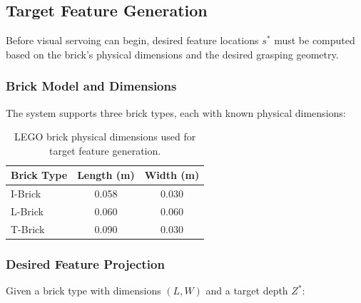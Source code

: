 \subsection{Target Feature Generation}

Before visual servoing can begin, desired feature locations $s^*$ must be computed based on the brick's physical dimensions and the desired grasping geometry.

\subsubsection{Brick Model and Dimensions}
The system supports three brick types, each with known physical dimensions:

\begin{table}[H]
    \centering
    \begin{tabular}{|l|c|c|}
        \hline
        \textbf{Brick Type} & \textbf{Length (m)} & \textbf{Width (m)} \\
        \hline
        I-Brick & 0.058 & 0.030 \\
        L-Brick & 0.060 & 0.060 \\
        T-Brick & 0.090 & 0.030 \\
        \hline
    \end{tabular}
    \caption{LEGO brick physical dimensions used for target feature generation.}
\end{table}

\subsubsection{Desired Feature Projection}
Given a brick type with dimensions $(L, W)$ and a target depth $Z^*$:


